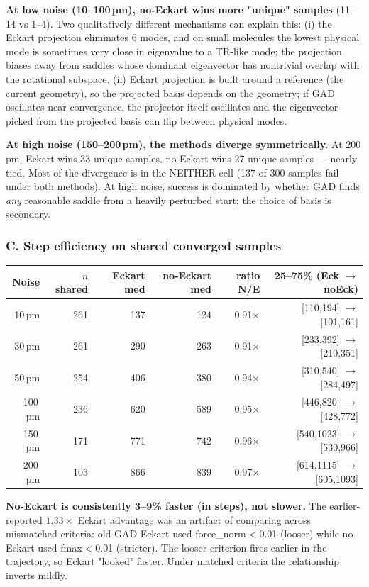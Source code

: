 \documentclass[11pt]{article}
\begin{document}
\textbf{At low noise (10--100\,pm), no-Eckart wins more "unique" samples}
(11--14 vs 1--4). Two qualitatively different mechanisms can explain this:
(i) the Eckart projection eliminates 6 modes, and on small molecules
the lowest physical mode is sometimes very close in eigenvalue to a
TR-like mode; the projection biases away from saddles whose dominant
eigenvector has nontrivial overlap with the rotational subspace.
(ii) Eckart projection is built around a reference (the current
geometry), so the projected basis depends on the geometry; if GAD
oscillates near convergence, the projector itself oscillates and the
eigenvector picked from the projected basis can flip between physical
modes.

\textbf{At high noise (150--200\,pm), the methods diverge symmetrically.}
At 200\,pm, Eckart wins 33 unique samples, no-Eckart wins 27 unique
samples --- nearly tied. Most of the divergence is in the NEITHER cell
(137 of 300 samples fail under both methods). At high noise, success
is dominated by whether GAD finds \emph{any} reasonable saddle from a
heavily perturbed start; the choice of basis is secondary.

\subsubsection*{C. Step efficiency on shared converged samples}

\begin{center}
\begin{tabular}{rrrrrr}
\toprule
Noise & $n$ shared & Eckart med & no-Eckart med & ratio N/E & 25--75\% (Eck $\to$ noEck) \\
\midrule
10\,pm  & 261 & 137 & 124 & 0.91$\times$ & [110,194] $\to$ [101,161] \\
30\,pm  & 261 & 290 & 263 & 0.91$\times$ & [233,392] $\to$ [210,351] \\
50\,pm  & 254 & 406 & 380 & 0.94$\times$ & [310,540] $\to$ [284,497] \\
100\,pm & 236 & 620 & 589 & 0.95$\times$ & [446,820] $\to$ [428,772] \\
150\,pm & 171 & 771 & 742 & 0.96$\times$ & [540,1023] $\to$ [530,966] \\
200\,pm & 103 & 866 & 839 & 0.97$\times$ & [614,1115] $\to$ [605,1093] \\
\bottomrule
\end{tabular}
\end{center}

\textbf{No-Eckart is consistently 3--9\% faster (in steps), not slower.}
The earlier-reported $1.33\times$ Eckart advantage was an artifact of
comparing across mismatched criteria: old GAD Eckart used force\_norm$<$0.01
(looser) while no-Eckart used fmax$<$0.01 (stricter). The looser criterion
fires earlier in the trajectory, so Eckart "looked" faster. Under
matched criteria the relationship inverts mildly.
\end{document}
